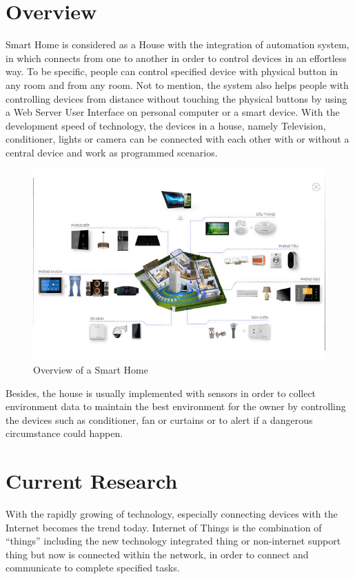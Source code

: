 \section{Overview}
Smart Home is considered as a House with the integration of automation system, in which connects from one to another in order to control devices in an effortless way. To be specific, people can control specified device with physical button in any room and from any room. Not to mention, the system also helps people with controlling devices from distance without touching the physical buttons by using a Web Server User Interface on personal computer or a smart device. With the development speed of technology, the devices in a house, namely Television, conditioner, lights or camera can be connected with each other with or without a central device and work as programmed scenarios.
\begin{figure}[!ht]
    \begin{center}
    \includegraphics[scale=0.6]{images/overview.jpg}
    \caption{Overview of a Smart Home}
    \label{fig:overviewSmartHome}
    \end{center}
  \end{figure}

Besides, the house is usually implemented with sensors in order to collect environment data to maintain the best environment for the owner by controlling the devices such as conditioner, fan or curtains or to alert if a dangerous circumstance could happen.

\section{Current Research}
    With the rapidly growing of technology, especially connecting devices with the Internet becomes the trend today. Internet of Things is the combination of “things” including the new technology integrated thing or non-internet support thing but now is connected within the network, in order to connect and communicate to complete specified tasks.


